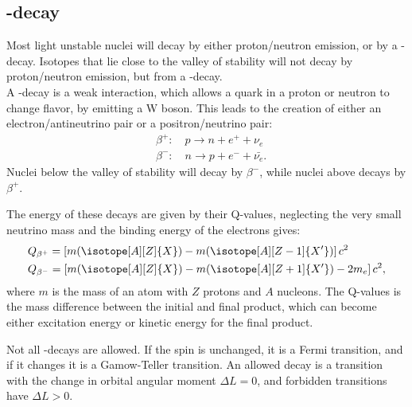 
\subsection{\be-decay}
\label{sec:beta}
Most light unstable nuclei will decay by either proton/neutron emission, or by a \be-decay. Isotopes that lie close to the valley of stability will not decay by proton/neutron emission, but from a \be-decay.
\\
A \be-decay is a weak interaction, which allows a quark in a proton or neutron to change flavor, by emitting a W boson. This leads to the creation of either an electron/antineutrino pair or a positron/neutrino pair:
\begin{align}
&\beta^+:\quad p\rightarrow n + e^+ + \nu_e\\
&\beta^-:\quad n\rightarrow p + e^- + \bar{\nu_e}.
\end{align}
Nuclei below the valley of stability will decay by $\beta^-$, while nuclei above decays by $\beta ^+$.

The energy of these decays are given by their Q-values, neglecting the very small neutrino mass and the binding energy of the electrons gives:
\begin{align}
&Q_{\beta^+} = \left[ m (\isotope[A][Z]{X}) - m(\isotope[A][Z-1]{X'})  		 \right] c^2\\
&Q_{\beta^-} = \left[ m (\isotope[A][Z]{X}) - m(\isotope[A][Z+1]{X'}) -2m_e  \right] c^2,
\end{align}
where $m$ is the mass of an atom with $Z$ protons and $A$ nucleons.
The Q-values is the mass difference between the initial and final product, which can become either excitation energy or kinetic energy for the final product. 

Not all \be-decays are allowed. If the spin is unchanged, it is a Fermi transition, and if it changes it is a Gamow-Teller transition. 
An allowed decay is a transition with the change in orbital angular moment $\Delta L = 0$, and forbidden transitions have $\Delta L > 0$.

